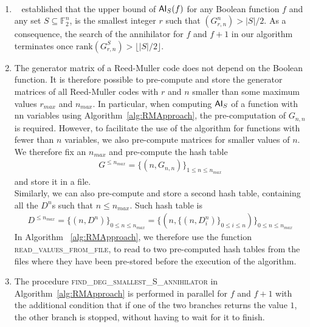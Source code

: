 \documentclass[11pt]{llncs}
\begin{document}
\begin{remark}~\label{rem:remarksOnAlg}
	\begin{enumerate}
		\item ~\cite{TOSC:CarMeaRot17} established that the upper bound of $\mathsf{AI}_S(f)$ for any Boolean function $f$ and any set $S\subseteq \mathbb{F}_2^n$, is the smallest integer $r$ such that $\left(G_{r,n}^n\right) > |S| / 2$. As a consequence, the search of the annihilator for $f$ and $f+ 1$ in our algorithm terminates once $\text{rank}\left(G_{r,n}^S\right) > \lfloor{|S| / 2}\rfloor$.\label{item:Item1RemOnAlg}
		\item The generator matrix of a Reed-Muller code does not depend on the Boolean function.
		 It is therefore possible to pre-compute and store the generator matrices of all Reed-Muller codes with $r$ and $n$ smaller than some maximum values $r_{max}$ and $n_{max}$. In particular, when computing $\mathsf{AI}_S$ of a function with nn variables using Algorithm~\ref{alg:RMApproach}, the pre-computation of $G_{n,n}$ is required. However, to facilitate the use of the algorithm for functions with fewer than $n$ variables, we also pre-compute matrices for smaller values of $n$.
		We therefore fix an $n_{max}$ and pre-compute the hash table
		\begin{align}\label{eq:matricesHashTable}
		G^{\leq n_{max}} = \{\left(n, G_{n,n}\right)\}_{1 \leq n \leq n_{max}}
		\end{align}
		and store it in a file.\\
        
		Similarly, we can also pre-compute and store a second hash table, containing all the $D^n$s such that $n \leq n_{max}$. Such hash table is
		\begin{align}\label{eq:degreesHashTable}
		D^{\leq n_{max}} =  \{\left(n,D^{n} \right)\}_{0 \leq n \leq n_{max}} =  \{\left(n, \{ \left(n, D_i^n\right)\}_{0\leq i \leq n} \right)\}_{0 \leq n \leq n_{max}}
		\end{align}
		In Algorithm ~\ref{alg:RMApproach}, we therefore use the function \textsc{read\_values\_from\_file}, to read to two pre-computed hash tables from the files where they have been pre-stored before the execution of the algorithm.
		\item The procedure \textsc{find\_deg\_smallest\_S\_annihilator} in Algorithm~\ref{alg:RMApproach} is performed in parallel for $f$ and $f+ 1$ with the additional condition that if one of the two branches returns the value $1$, the other branch is stopped, without having to wait for it to finish.
	\end{enumerate}	
\end{remark}
\end{document}
